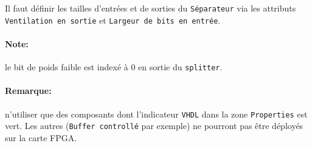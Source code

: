 \documentclass{article}
\begin{document}
    Il faut définir les tailles d'entrées et de sorties du \texttt{Séparateur} via les attributs \texttt{Ventilation en sortie} et
    \texttt{Largeur de bits en entrée}.

    \paragraph{Note:} le bit de poids faible est indexé à 0 en sortie du \texttt{splitter}.

    \paragraph{Remarque:} n'utiliser que des composants dont l'indicateur \texttt{VHDL} dans la zone \texttt{Properties} est vert.
    Les autres (\texttt{Buffer controllé} par exemple) ne pourront pas être déployés sur la carte FPGA.
\end{document}
